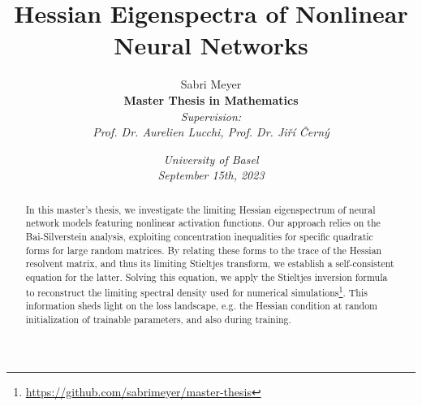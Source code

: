 \documentclass{article}
\title{\textbf{Hessian Eigenspectra of Nonlinear Neural Networks}}
\author{Sabri Meyer \bigskip \\ \bigskip \textbf{Master Thesis in Mathematics} \\ \emph{Supervision:} \\ \emph{Prof. Dr. Aurelien Lucchi, Prof. Dr. Jiří Černý}}
\date{\emph{University of Basel} \\ \emph{September 15th, 2023}}
\begin{document}

\newtheorem{common}{Common}[subsection]
\newtheorem{definition}[common]{Definition}
\newtheorem{proposition}[common]{Proposition}
\newtheorem{lemma}[common]{Lemma}
\newtheorem{theorem}[common]{Theorem}
\newtheorem{corollary}[common]{Corollary}
\newtheorem{assumption}[common]{Assumption}

\maketitle
\thispagestyle{empty}

\begin{abstract}
In this master's thesis, we investigate the limiting Hessian eigenspectrum of neural network models featuring nonlinear activation functions. Our approach relies on the Bai-Silverstein analysis, exploiting concentration inequalities for specific quadratic forms for large random matrices. By relating these forms to the trace of the Hessian resolvent matrix, and thus its limiting Stieltjes transform, we establish a self-consistent equation for the latter. Solving this equation, we apply the Stieltjes inversion formula to reconstruct the limiting spectral density used for numerical simulations\footnote{\href{https://github.com/sabrimeyer/master-thesis}{https://github.com/sabrimeyer/master-thesis}}. This information sheds light on the loss landscape, e.g. the Hessian condition at random initialization of trainable parameters, and also during training.
\end{abstract}

\newpage
\tableofcontents

\newpage
\end{document}
